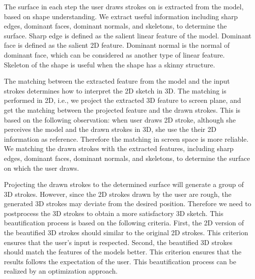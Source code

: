 The surface in each step the user draws strokes on is extracted from the model, based on shape understanding. We extract useful information including sharp edges, dominant faces, dominant normals, and skeletons, to determine the surface. Sharp edge is defined as the salient linear feature of the model. Dominant face is defined as the salient 2D feature. Dominant normal is the normal of dominant face, which can be considered as another type of linear feature. Skeleton of the shape is useful when the shape has a skinny structure.

The matching between the extracted feature from the model and the input strokes determines how to interpret the 2D sketch in 3D. The matching is performed in 2D, i.e., we project the extracted 3D feature to screen plane, and get the matching between the projected feature and the drawn strokes. This is based on the following observation: when user draws 2D stroke, although she perceives the model and the drawn strokes in 3D, she use the their 2D information as reference. Therefore the matching in screen space is more reliable. We matching the drawn strokes with the extracted features, including sharp edges, dominant faces, dominant normals, and skeletons, to determine the surface on which the user draws.

Projecting the drawn strokes to the determined surface will generate a group of 3D strokes. However, since the 2D strokes drawn by the user are rough, the generated 3D strokes may deviate from the desired position. Therefore we need to postprocess the 3D strokes to obtain a more satisfactory 3D sketch. This beautification process is based on the following criteria. First, the 2D version of the beautified 3D strokes should similar to the original 2D strokes. This criterion ensures that the user's input is respected. Second, the beautified 3D strokes should match the features of the models better. This criterion ensures that the results follows the expectation of the user.  This beautification process can be realized by an optimization approach.
